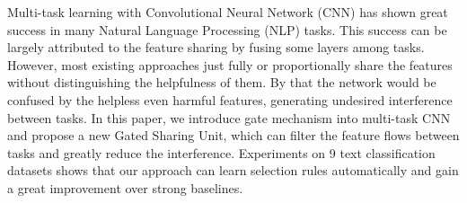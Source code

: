 Multi-task learning with Convolutional Neural Network (CNN) has shown great success in many Natural Language Processing (NLP) tasks. This success can be largely attributed to the feature sharing by fusing some layers among tasks. However, most existing approaches just fully or proportionally share the features without distinguishing the helpfulness of them. By that the network would be confused by the helpless even harmful features, generating undesired interference between tasks. In this paper, we introduce gate mechanism into multi-task CNN and propose a new Gated Sharing Unit, which can filter the feature flows between tasks and greatly reduce the interference. Experiments on 9 text classification datasets shows that our approach can learn selection rules automatically and gain a great improvement over strong baselines.

